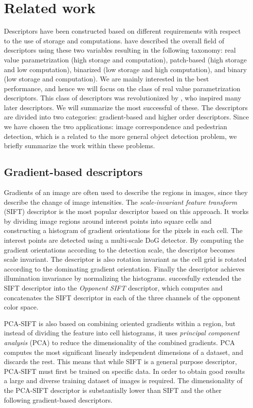 \documentclass[thesis.tex]{subfiles}
\begin{document}
\chapter{Related work}
Descriptors have been constructed based on different requirements with respect to the use of storage and computations. \citet{heinly2012comparative} have described the overall field of descriptors using these two variables resulting in the following taxonomy: real value parametrization (high storage and computation), patch-based (high storage and low computation), binarized (low storage and high computation), and binary (low storage and computation). We are mainly interested in the best performance, and hence we will focus on the class of real value parametrization descriptors. This class of descriptors was revolutionized by \citet{lowe2004distinctive}, who inspired many later descriptors. We will summarize the most successful of these. The descriptors are divided into two categories: gradient-based and higher order descriptors. Since we have chosen the two applications: image correspondence and pedestrian detection, which is a related to the more general object detection problem, we briefly summarize the work within these problems.

\section{Gradient-based descriptors}
\label{sec:gradientDescriptors}
Gradients of an image are often used to describe the regions in images, since they describe the change of image intensities. The \emph{scale-invariant feature transform} (SIFT) descriptor \cite{lowe2004distinctive} is the most popular descriptor based on this approach. It works by dividing image regions around interest points into square cells and constructing a histogram of gradient orientations for the pixels in each cell. The interest points are detected using a multi-scale DoG detector. By computing the gradient orientations according to the detection scale, the descriptor becomes scale invariant. The descriptor is also rotation invariant as the cell grid is rotated according to the dominating gradient orientation. Finally the descriptor achieves illumination invariance by normalizing the histograms. \citet{van2010evaluating} succesfully extended the SIFT descriptor into the \emph{Opponent SIFT} descriptor, which computes and concatenates the SIFT descriptor in each of the three channels of the opponent color space.

PCA-SIFT \cite{ke2004pca} is also based on combining oriented gradients within a region, but instead of dividing the feature into cell histograms, it uses \emph{principal component analysis} (PCA) to reduce the dimensionality of the combined gradients. PCA computes the most significant linearly independent dimensions of a dataset, and discards the rest. This means that while SIFT is a general purpose descriptor, PCA-SIFT must first be trained on specific data. In order to obtain good results a large and diverse training dataset of images is required. The dimensionality of the PCA-SIFT descriptor is substantially lower than SIFT and the other following gradient-based descriptors.
\end{document}
